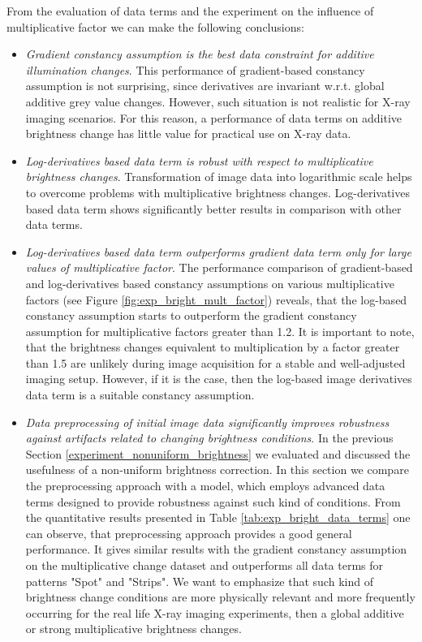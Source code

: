 From the evaluation of data terms and the experiment on the influence of multiplicative factor we can make the following conclusions:

\begin{itemize}

\item \textit{Gradient constancy assumption is the best data constraint for additive illumination changes}. This performance of gradient-based constancy assumption is not surprising, since derivatives are invariant w.r.t. global additive grey value changes. However, such situation is not realistic for X-ray imaging scenarios. For this reason, a performance of data terms on additive brightness change has little value for practical use on X-ray data.     

\item \textit{Log-derivatives based data term is robust with respect to multiplicative brightness changes}. Transformation of image data into logarithmic scale helps to overcome problems with multiplicative brightness changes. Log-derivatives based data term shows significantly better results in comparison with other data terms.

\item \textit{Log-derivatives based data term outperforms gradient data term only for large values of multiplicative factor}. The performance comparison of gradient-based and log-derivatives based constancy assumptions on various multiplicative factors (see Figure \ref{fig:exp_bright_mult_factor}) reveals, that the log-based constancy assumption starts to outperform the gradient constancy assumption for multiplicative factors greater than 1.2. It is important to note, that the brightness changes equivalent to multiplication by a factor greater than 1.5 are unlikely during image acquisition for a stable and well-adjusted imaging setup. However, if it is the case, then the log-based image derivatives data term is a suitable constancy assumption.  

\item \textit{Data preprocessing of initial image data significantly improves robustness against artifacts related to changing brightness conditions}. In the previous Section \ref{experiment_nonuniform_brightness} we evaluated and discussed the usefulness of a non-uniform brightness correction. In this section we compare the preprocessing approach with a model, which employs advanced data terms designed to provide robustness against such kind of conditions. From the quantitative results presented in Table \ref{tab:exp_bright_data_terms} one can observe, that preprocessing approach provides a good general performance. It gives similar results with the gradient constancy assumption on the multiplicative change dataset and outperforms all data terms for patterns "Spot" and "Strips". We want to emphasize that such kind of brightness change conditions are more physically relevant and more frequently occurring for the real life X-ray imaging experiments, then a global additive or strong multiplicative brightness changes.
\end{itemize}



